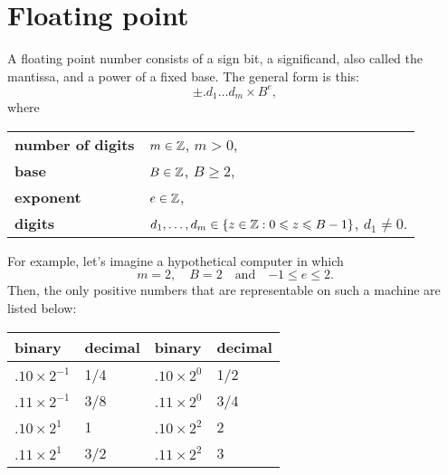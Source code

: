 \section{Floating point}\label{sec:floating-point}

A floating point number consists of a sign bit, a significand, also called the
mantissa, and a power of a fixed base. The general form is this:
\begin{equation}\label{eq:floating-point-representation}
  \pm{.d_{1}\ldots{d_{m}}\times{B^{e}}},
\end{equation}
where
\begin{table}[H]
  \centering
  \begin{tabular}{ll}
    \textbf{number of digits} & \(m\in\mathbb{Z}\), \(m>0\),           \\
    \textbf{base}             & \(B\in\mathbb{Z}\), \(B\geqslant{2}\), \\
    \textbf{exponent}         & \(e\in\mathbb{Z}\),                    \\
    \textbf{digits}           & \(d_{1},\ldots,d_{m}\in\left\{z\in\mathbb{Z}:0\leqslant{z}\leqslant{B-1}\right\}\), \(d_{1}\neq{0}\).
  \end{tabular}
\end{table}
For example, let's imagine a hypothetical computer in which
\begin{equation}\label{eq:hypothetical-computer}
  m=2,\quad{B=2}\quad\text{and}\quad{-1\leqslant{e}\leqslant{2}}.
\end{equation}
Then, the only positive numbers that are representable on such a machine are
listed below:
\begin{table}[H]
  \centering
  \begin{tabular}{l|l||l|l}
    \textbf{binary}       & \textbf{decimal} & \textbf{binary}      & \textbf{decimal} \\ \hline
    \(.10\times{2^{-1}}\) & 1/4              & \(.10\times{2^{0}}\) & 1/2              \\
    \(.11\times{2^{-1}}\) & 3/8              & \(.11\times{2^{0}}\) & 3/4              \\
    \(.10\times{2^{1}}\)  & 1                & \(.10\times{2^{2}}\) & 2                \\
    \(.11\times{2^{1}}\)  & 3/2              & \(.11\times{2^{2}}\) & 3                \\
  \end{tabular}
\end{table}

